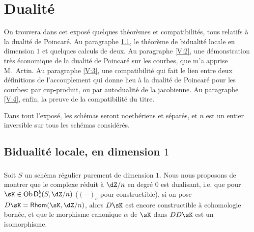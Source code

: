 
\chapter{Dualité}\label{V}




















On trouvera dans cet exposé quelques théorèmes et compatibilités, tous 
relatifs à la dualité de Poincaré. Au paragraphe \ref{V:1}, le théorème de 
bidualité locale en dimension $1$ \cite[I.5.1]{sga5} et quelques calculs de 
deux. Au paragraphe \ref{V:2}, une démonstration très économique de la dualité 
de Poincaré sur les courbes, que m'a apprise M.\ Artin. Au paragraphe 
\ref{V:3}, une compatibilité qui fait le lien entre deux définitions de 
l'accouplement qui donne lieu à la dualité de Poincaré pour les courbes: par 
cup-produit, ou par autodualité de la jacobienne. Au paragraphe \ref{V:4}, 
enfin, la preuve de la compatibilité du titre. 

Dans tout l'exposé, les schémas seront noethériens et séparés, et $n$ 
est un entier inversible sur tous les schémas considérés. 










\section{Bidualité locale, en dimension \texorpdfstring{$1$}{1}}\label{V:1}





\subsection{}\label{V:1-1}

Soit $S$ un schéma régulier purement de dimension $1$. Nous nous proposons 
de montrer que le complexe réduit à $\dZ/n$ en degré $0$ est 
dualisant, i.e. que pour $\sK\in \ob\D_c^b(S,\dZ/n)$ ($(-)_c$ pour 
constructible), si on pose $D\sK=\rHom(\sK,\dZ/n)$, alors $D\sK$ est encore 
constructible à cohomologie bornée, et que le morphisme canonique $\alpha$ 
de $\sK$ dans $D D\sK$ est un isomorphisme. 

